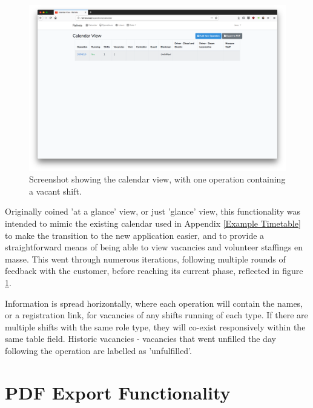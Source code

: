 \begin{figure}[!ht]
    \centering
    \includegraphics[width=1.0\textwidth]{Figures/screenshot-calendar}
    \caption{Screenshot showing the calendar view, with one operation containing a vacant shift.}
    \label{fig:calendarview}
\end{figure}

Originally coined 'at a glance' view, or just 'glance' view, this functionality was intended to mimic the existing calendar used in Appendix \ref{Example Timetable} to make the transition to the new application easier, and to provide a straightforward means of being able to view vacancies and volunteer staffings en masse. This went through numerous iterations, following multiple rounds of feedback with the customer, before reaching its current phase, reflected in figure \ref{fig:calendarview}.

Information is spread horizontally, where each operation will contain the names, or a registration link, for vacancies of any shifts running of each type. If there are multiple shifts with the same role type, they will co-exist responsively within the same table field. Historic vacancies - vacancies that went unfilled the day following the operation are labelled as 'unfulfilled'.

\section{PDF Export Functionality}

